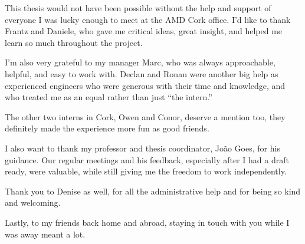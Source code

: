 This thesis would not have been possible without the help and support of everyone I was lucky enough to meet at the AMD Cork office. I’d like to thank Frantz and Daniele, who gave me critical ideas, great insight, and helped me learn so much throughout the project.

I’m also very grateful to my manager Marc, who was always approachable, helpful, and easy to work with. Declan and Ronan were another big help as experienced engineers who were generous with their time and knowledge, and who treated me as an equal rather than just “the intern.”

The other two interns in Cork, Owen and Conor, deserve a mention too, they definitely made the experience more fun as good friends.

I also want to thank my professor and thesis coordinator, João Goes, for his guidance. Our regular meetings and his feedback, especially after I had a draft ready, were valuable, while still giving me the freedom to work independently.

Thank you to Denise as well, for all the administrative help and for being so kind and welcoming.

Lastly, to my friends back home and abroad, staying in touch with you while I was away meant a lot.